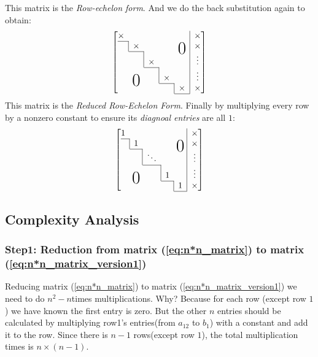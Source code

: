 \begin{example}
This matrix is the \emph{Row-echelon form}.
And we do the back substitution again to obtain:
\begin{equation}
  \left[
    \begin{array}{@{}ccccc|c@{}}
    \x    &        &     &     &  & \x\\ \cline{1-1}
    \bord & \x       &     &     & \bigzero & \x\\ \cline{2-2}
          & \bord    & \x    &     &  & \vdots \\ \cline{3-3}
          & \bigzero & \bord & \x    &  & \vdots \\ \cline{4-4}
          &          &       & \bord & \x & \x \\ \cline{5-5}
  \end{array}\right]\label{eq:n*n_matrix_version3}
\end{equation}
This matrix is the \emph{Reduced Row-Echelon Form}.
Finally by multiplying every row by a nonzero constant to ensure its \emph{diagnoal entries} are all $1$:
\begin{equation}
  \left[
    \begin{array}{@{}ccccc|c@{}}
    1    &        &     &     &  & \x\\ \cline{1-1}
    \bord & 1       &     &     & \bigzero & \x\\ \cline{2-2}
          & \bord    & \ddots    &     &  & \vdots \\ \cline{3-3}
          & \bigzero & \bord & 1    &  & \vdots \\ \cline{4-4}
          &          &       & \bord & 1 & \x \\ \cline{5-5}
  \end{array}\right]\label{eq:n*n_matrix_version4}
\end{equation}
\end{example}


\subsection{Complexity Analysis}
\subsubsection{Step1: Reduction from matrix (\ref{eq:n*n_matrix}) to matrix (\ref{eq:n*n_matrix_version1})}

\qquad Reducing matrix (\ref{eq:n*n_matrix}) to matrix (\ref{eq:n*n_matrix_version1}) we need to do $n^2-n$times multiplications. Why? Because for each row (except row $1$) we have known the first entry is zero. But the other $n$ entries should be calculated by multiplying row1's entries(from $a_{12}$ to $b_1$) with a constant and add it to the row. Since there is $n-1$ rows(except row $1$), the total multiplication times is $n\times (n-1)$.

